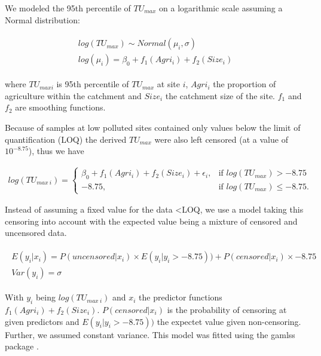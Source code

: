 \documentclass[pdftex,a4paper]{scrreprt}
\begin{document}
We modeled the 95th percentile of $TU_{max}$ on a logarithmic scale assuming a Normal distribution:

\begin{align}
\begin{split}
  log(TU_{max}) \sim Normal(\mu_i, \sigma) \\
  log(\mu_i)= \beta_0 + f_1(Agri_i) + f_2(Size_i)
\end{split}
\end{align}

where $TU_{max i}$ is 95th percentile of $TU_{max}$ at site $i$, $Agri_i$ the proportion of agriculture within the catchment and $Size_i$ the catchment size of the site.  
$f_1$ and $f_2$ are smoothing functions.

Because of samples at low polluted sites contained only values below the limit of quantification (LOQ) the derived $TU_{max}$ were also left censored (at a value of $10^{-8.75}$), thus we have

\begin{align}
  log(TU_{max~i})=\begin{cases}
    \beta_0 + f_1(Agri_i) + f_2(Size_i) + \epsilon_i, & \text{if $log(TU_{max}) > -8.75 $}\\
    -8.75, & \text{if $log(TU_{max}) \le -8.75 $}.
  \end{cases}
\end{align}


Instead of assuming a fixed value for the data \textless LOQ, we use a model taking this censoring into account \citep{helsel_fabricating_2006} with the expected value being a mixture of censored and uncensored data.

\begin{align}
\begin{split}
	E(y_i | x_i) = P(uncensored|x_i) \times E(y_i | y_i > -8.75)) + P(censored|x_i) \times -8.75\\
	Var(y_i) = \sigma
\end{split}
\end{align}

With $y_i$ being $log(TU_{max~i})$ and $x_i$ the predictor functions $f_1(Agri_i) + f_2(Size_i)$. $P(censored|x_i)$ is the probability of censoring at given predictors and $E(y_i | y_i > -8.75))$ the expectet value given non-censoring. Further, we assumed constant variance. This model was fitted using the gamlss package \citep{stasinopoulos_generalized_2007}.
\end{document}
